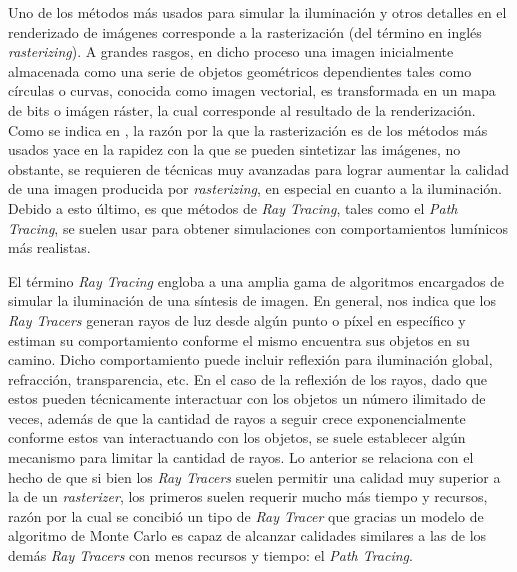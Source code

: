 \documentclass[conference]{IEEEtran}
\begin{document}
Uno de los métodos más usados para simular la iluminación y otros detalles en el renderizado de imágenes corresponde a la rasterización (del término en inglés \textit{rasterizing}). A grandes rasgos, en dicho proceso una imagen inicialmente almacenada como una serie de objetos geométricos dependientes tales como círculas o curvas, conocida como imagen vectorial, es transformada en un mapa de bits o imágen ráster, la cual corresponde al resultado de la renderización. Como se indica en \cite{b2}, la razón por la que la rasterización es de los métodos más usados yace en la rapidez con la que se pueden sintetizar las imágenes, no obstante, se requieren de técnicas muy avanzadas para lograr aumentar la calidad de una imagen producida por \textit{rasterizing}, en especial en cuanto a la iluminación. Debido a esto último, es que métodos de \textit{Ray Tracing}, tales como el \textit{Path Tracing}, se suelen usar para obtener simulaciones con comportamientos lumínicos más realistas. 

El término \textit{Ray Tracing} engloba a una amplia gama de algoritmos encargados de simular la iluminación de una síntesis de imagen. En general, \cite{b2} nos indica que los \textit{Ray Tracers} generan rayos de luz desde algún punto o píxel en específico y estiman su comportamiento conforme el mismo encuentra sus objetos en su camino. Dicho comportamiento puede incluir reflexión para iluminación global, refracción, transparencia, etc. En el caso de la reflexión de los rayos, dado que estos pueden técnicamente interactuar con los objetos un número ilimitado de veces, además de que la cantidad de rayos a seguir crece exponencialmente conforme estos van interactuando con los objetos, se suele establecer algún mecanismo para limitar la cantidad de rayos. Lo anterior se relaciona con el hecho de que si bien los \textit{Ray Tracers} suelen permitir una calidad muy superior a la de un \textit{rasterizer}, los primeros suelen requerir mucho más tiempo y recursos, razón por la cual se concibió un tipo de \textit{Ray Tracer} que gracias un modelo de algoritmo de Monte Carlo es capaz de alcanzar calidades similares a las de los demás \textit{Ray Tracers} con menos recursos y tiempo: el \textit{Path Tracing}.
\end{document}

